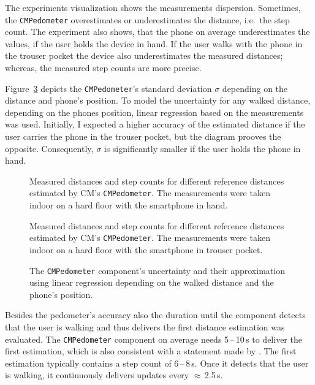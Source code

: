 The experiments visualization shows the measurements dispersion. Sometimes, the \texttt{CMPedometer} overestimates or underestimates the distance, i.e.\ the step count. The experiment also shows, that the phone on average underestimates the values, if the user holds the device in hand. If the user walks with the phone in the trouser pocket the device also underestimates the measured distances; whereas, the measured step counts are more precise.

Figure~\ref{fig:eval:pedometerNDF} depicts the \texttt{CMPedometer}'s standard deviation $\sigma$ depending on the distance and phone's position. To model the uncertainty for any walked distance, depending on the phones position, linear regression based on the measurements was used. Initially, I expected a higher accuracy of the estimated distance if the user carries the phone in the trouser pocket, but the diagram prooves the opposite. Consequently, $\sigma$ is significantly smaller if the user holds the phone in hand.

\begin{figure}
      
	\caption{Measured distances and step counts for different reference distances estimated by \ac{CM}'s \texttt{CMPedometer}. The measurements were taken indoor on a hard floor with the smartphone in hand.}
	\label{fig:eval:pedometerHand}
\end{figure}

\begin{figure}
  
  \caption{Measured distances and step counts for different reference distances estimated by \ac{CM}'s \texttt{CMPedometer}. The measurements were taken indoor on a hard floor with the smartphone in trouser pocket.}
  \label{fig:eval:pedometerPocket}
\end{figure}

\begin{figure}
  
  \caption {The \texttt{CMPedometer} component's uncertainty and their approximation using linear regression depending on the walked distance and the phone's position.}
  \label{fig:eval:pedometerNDF}
\end{figure}


Besides the pedometer's accuracy also the duration until the component detects that the user is walking and thus delivers the first distance estimation was evaluated. The \texttt{CMPedometer} component on average needs 5\,--\,10\,s to deliver the first estimation, which is also consistent with a statement made by \citet{apple:wwdc_2014_pham}. The first estimation typically contains a step count of 6\,--\,8\,s. Once it detects that the user is walking, it continuously delivers updates every $\approx$\,2.5\,s.


